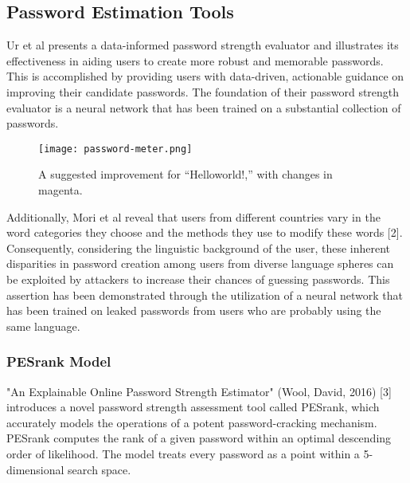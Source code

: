\documentclass[5p,twocolumn]{elsarticle}
\begin{document}
\subsection{\textbf{Password Estimation Tools}}
Ur et al presents a data-informed password strength evaluator and illustrates its effectiveness in aiding users to create more robust and memorable passwords. This is accomplished by providing users with data-driven, actionable guidance on improving their candidate passwords. The foundation of their password strength evaluator is a neural network that has been trained on a substantial collection of passwords. 
\begin{figure}[h]
	\centering 
	\texttt{[image: password-meter.png]}	
	\caption{A suggested improvement for “Helloworld!,”
with changes in magenta.} 
	\label{fig_mom0}%
\end{figure}
Additionally, Mori et al reveal that users from different countries vary in the word categories they choose and the methods they use to modify these words [2]. Consequently, considering the linguistic background of the user, these inherent disparities in password creation among users from diverse language spheres can be exploited by attackers to increase their chances of guessing passwords. This assertion has been demonstrated through the utilization of a neural network that has been trained on leaked passwords from users who are probably using the same language. 

\subsubsection{\textbf{PESrank Model}}
"An Explainable Online Password Strength Estimator" (Wool, David, 2016) [3] introduces a novel password strength assessment tool called PESrank, which accurately models the operations of a potent password-cracking mechanism. PESrank computes the rank of a given password within an optimal descending order of likelihood. The model treats every password as a point within a 5-dimensional search space. 
\end{document}
